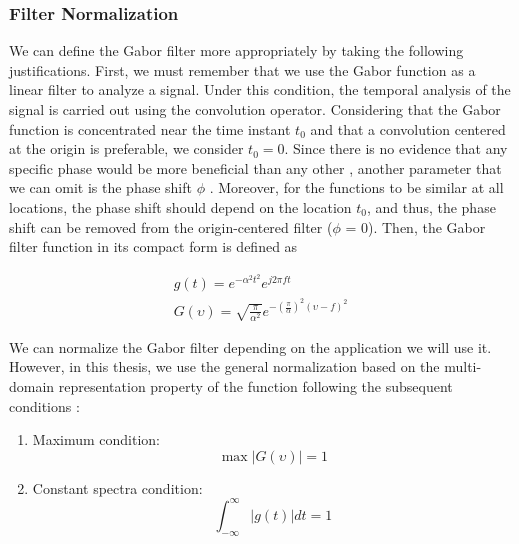 \documentclass[journal]{IEEEtran}
\begin{document}
\subsubsection{Filter Normalization} \label{subsec:filter_normalization}
We can define the Gabor filter more appropriately by taking the following justifications. First, we must remember that we use the Gabor function as a linear filter to analyze a signal. Under this condition, the temporal analysis of the signal is carried out using the convolution operator. Considering that the Gabor function is concentrated near the time instant $t_0$ and that a convolution centered at the origin is preferable, we consider $t_0 = 0$. Since there is no evidence that any specific phase would be more beneficial than any other \cite{Liu.Koga.ea:ICDAR:2005}, another parameter that we can omit is the phase shift $\phi$ . Moreover, for the functions to be similar at all locations, the phase shift should depend on the location $t_0$, and thus, the phase shift can be removed from the origin-centered filter ($\phi$ = 0). Then, the Gabor filter function in its compact form is defined as 

\begin{equation}\label{eq:gabor_function_1d_timefreq_compact}
    \begin{gathered}
         g(t) =  e ^{-\alpha^2 t^2} e ^{j 2 \pi f t } \\
         G(\upsilon) =  \sqrt{\frac{\pi}{\alpha^2}} e ^{-\left(\frac{\pi}{\alpha}\right) ^{2} (\upsilon-f)^2} 
     \end{gathered}
\end{equation}

We can normalize the Gabor filter depending on the application we will use it. However, in this thesis, we use the general normalization based on the multi-domain representation property of the function following the subsequent conditions \cite{Boukerroui.Noble.ea:JMIV:2004}:

\begin{enumerate}
    \item Maximum condition:
        \begin{equation}\label{eq:maximun_condition}
            \max{|G(\upsilon)|} = 1
        \end{equation}
    \item Constant spectra condition:
        \begin{equation}\label{eq:constant_spectrum_condition}
            \int_{-\infty}^{\infty} |g(t)| dt = 1
        \end{equation}        
\end{enumerate}
\end{document}
